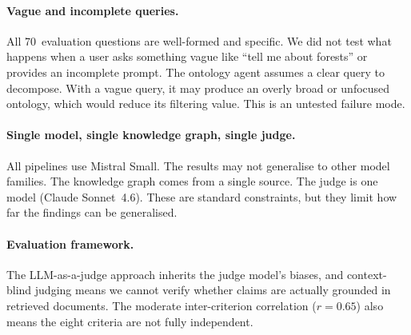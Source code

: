 \paragraph{Vague and incomplete queries.} All 70~evaluation questions are well-formed and specific. We did not test what happens when a user asks something vague like ``tell me about forests'' or provides an incomplete prompt. The ontology agent assumes a clear query to decompose. With a vague query, it may produce an overly broad or unfocused ontology, which would reduce its filtering value. This is an untested failure mode.

\paragraph{Single model, single knowledge graph, single judge.} All pipelines use Mistral Small. The results may not generalise to other model families. The knowledge graph comes from a single source. The judge is one model (Claude Sonnet~4.6). These are standard constraints, but they limit how far the findings can be generalised.

\paragraph{Evaluation framework.} The LLM-as-a-judge approach inherits the judge model's biases, and context-blind judging means we cannot verify whether claims are actually grounded in retrieved documents. The moderate inter-criterion correlation ($r = 0.65$) also means the eight criteria are not fully independent.
